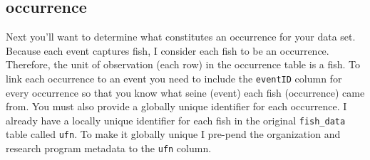 \documentclass[]{book}
\begin{document}
\hypertarget{occurrence}{%
\subsection{occurrence}\label{occurrence}}

Next you'll want to determine what constitutes an occurrence for your data set. Because each event captures fish, I consider each fish to be an occurrence. Therefore, the unit of observation (each row) in the occurrence table is a fish. To link each occurrence to an event you need to include the \texttt{eventID} column for every occurrence so that you know what seine (event) each fish (occurrence) came from. You must also provide a globally unique identifier for each occurrence. I already have a locally unique identifier for each fish in the original \texttt{fish\_data} table called \texttt{ufn}. To make it globally unique I pre-pend the organization and research program metadata to the \texttt{ufn} column.
\end{document}
